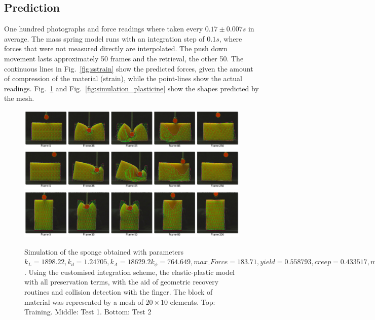 \documentclass[journal]{IEEEtran}
\newcommand{\fref}[1]{Fig.~\ref{#1}}
\begin{document}
\subsection{Prediction}

One hundred photographs and force readings where taken every $0.17\pm0.007 s$ in average.  The mass spring model runs with an integration step of $0.1s$, where forces that were not measured directly are interpolated.  The push down movement lasts approximately 50 frames and the retrieval, the other 50.  The continuous lines in \fref{fig:sstrain} show the predicted forces, given the amount of compression of the material (strain), while the point-lines show the actual readings.  \fref{fig:simulation_sponge} and \fref{fig:simulation_plasticine} show the shapes predicted by the mesh.

\begin{figure}[!t]
\centering
\includegraphics[width=178mm]{arrio9}
\includegraphics[width=178mm]{arrio10}
\includegraphics[width=178mm]{arrio11}
\caption{Simulation of the sponge obtained with parameters $k_L=1898.22, k_d=1.24705, k_A=18629.2 k_{\phi}=764.649, max\_Force=183.71, yield=0.558793, creep=0.433517, max\_\alpha=0.73364$.  Using the customised integration scheme, the elastic-plastic model with all preservation terms, with the aid of geometric recovery routines and collision detection with the finger.  The block of material was represented by a mesh of $20 \times 10$ elements. Top: Training. Middle: Test 1. Bottom: Test 2}\label{fig:simulation_sponge}
\end{figure}
\end{document}
